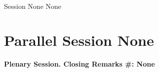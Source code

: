 \clearpage
{}
\begin{ThreeSessionOverview}{Session None}{\daydateyear}
  {None}
\end{ThreeSessionOverview}

\newpage
\section*{Parallel Session None}
{\bfseries\large Plenary Session. Closing Remarks #: None}\\
\TrackALoc\hfill\sessionchair{}{}
\clearpage


